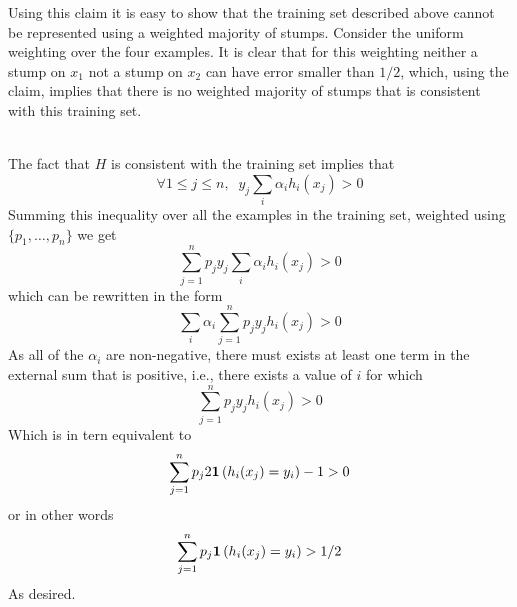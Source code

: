 \documentclass[12pt]{article}
\begin{document}
\begin{enumerate}
Using this claim it is easy to show that the training set described
above cannot be represented using a weighted majority of
stumps. Consider the uniform weighting over the four examples. It is
clear that for this weighting neither a stump on $x_1$ not a stump on
$x_2$ can have error smaller than $1/2$, which, using the claim,
implies that there is no weighted majority of stumps that is
consistent with this training set.

\\
The fact that $H$ is consistent with the training set implies that 
\[
\forall 1\leq j \leq n,\;\; y_j \sum_i \alpha_i h_i(x_j) > 0
\]
Summing this inequality over all the examples in the training set,
weighted using $\{p_1,\ldots,p_n\}$ we get
\[
\sum_{j=1}^n p_j y_j \sum_i \alpha_i h_i(x_j) > 0
\]
which can be rewritten in the form
\[
\sum_i \alpha_i \sum_{j=1}^n p_j y_j h_i(x_j) > 0
\]
As all of the $\alpha_i$ are non-negative, there must exists at least
one term in the external sum that is positive, i.e., there exists a
value of $i$ for which
\[
\sum_{j=1}^n p_j y_j h_i(x_j) > 0
\]
Which is in tern equivalent to 
\[
\sum_{j=1}^n p_j 2{\bf 1}\left( h_i(x_j) = y_i \right) - 1 >0
\]
or in other words
\[
\sum_{j=1}^n p_j {\bf 1}\left( h_i(x_j) = y_i \right) > 1/2
\]
As desired.
\end{enumerate}
\end{document}

